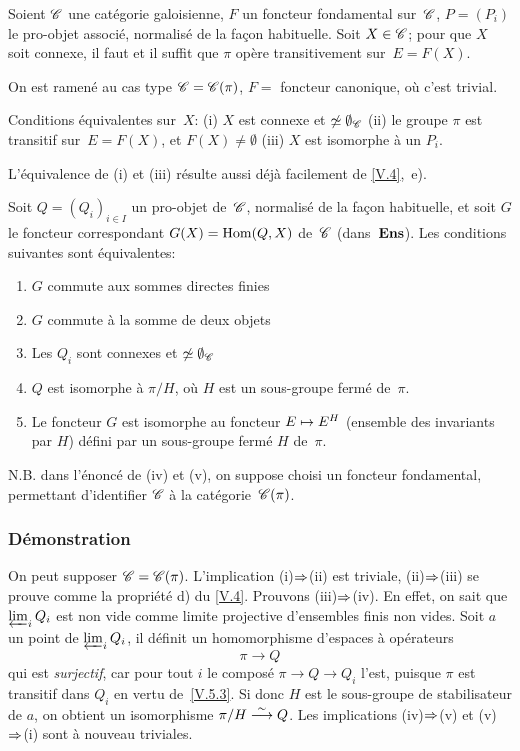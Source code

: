\begin{proposition}
\label{V.5.3}
Soient $\cal{C}$ une cat\'egorie galoisienne, $F$ un foncteur
fondamental
sur~$\cal{C}$,
$P=(P_i)$ le pro-objet associ\'e, normalis\'e de la fa\c con
habituelle. Soit
$X\in\cal{C}$;
pour que $X$ soit connexe, il faut et il suffit que $\pi$ op\`ere
transitivement sur~$E=F(X)$.
\end{proposition}

On est ramen\'e au cas type $\cal{C}=\cal{C}(\pi)$, $F=$ foncteur
canonique, o\`u c'est trivial.

\begin{corollaire}
\label{V.5.4}
Conditions \'equivalentes sur~$X$: \textup{(i)} $X$ est connexe et
$\not\simeq\emptyset_{\cal{C}}$ \textup{(ii)} le groupe $\pi$ est
transitif sur~$E=F(X)$, et $F(X)\ne\emptyset$ \textup{(iii)} $X$ est
isomorphe \`a un $P_i$.
\end{corollaire}

L'\'equivalence
de (i) et (iii) r\'esulte aussi d\'ej\`a facilement de
\No \ref{V.4},~e).

\begin{proposition}
\label{V.5.5}
Soit $Q=(Q_i)_{i\in I}$ un pro-objet
de~$\cal{C}$,
normalis\'e de la fa\c con habituelle, et soit $G$ le foncteur
correspondant $G(X)=\operatorname{Hom}(Q, X)$ de~$\cal{C}$
(dans~$\mathbf{Ens}$).
Les conditions suivantes sont \'equivalentes:
\begin{enumerate}
\item[(i)] $G$ commute aux sommes directes finies
\item[(ii)] $G$ commute \`a la somme de deux objets
\item[(iii)] Les $Q_i$ sont connexes et
$\not\simeq\emptyset_\cal{C}$
\item[(iv)] $Q$ est isomorphe \`a $\pi/H$, o\`u $H$ est un
sous-groupe ferm\'e de~$\pi$.
\item[(v)] Le foncteur $G$ est isomorphe au foncteur $E\mto
E^H$ (ensemble des invariants par $H$) d\'efini par un sous-groupe
ferm\'e $H$ de~$\pi$.
\end{enumerate}
\end{proposition}

N.B. dans l'\'enonc\'e de (iv) et (v), on suppose choisi un
foncteur fondamental, permettant d'identifier $\cal{C}$ \`a la
cat\'egorie~$\cal{C}(\pi)$.

\subsubsection*{D\'emonstration} On peut supposer
$\cal{C}=\cal{C}(\pi)$. L'implication (i)$\To$(ii) est
triviale, (ii)$\To$(iii) se prouve comme la
propri\'et\'e d) du \No \ref{V.4}. Prouvons (iii)$\To$(iv). En
effet, on sait que $\varprojlim_i Q_i$ est non vide comme limite
projective d'ensembles finis non vides. Soit $a$ un point de
$\varprojlim_i Q_i$, il d\'efinit un homomorphisme d'espaces \`a
op\'erateurs
$$
\pi\to Q
$$
qui est \emph{surjectif}, car pour tout $i$ le compos\'e $\pi\to
Q\to Q_i$ l'est, puisque $\pi$ est transitif dans $Q_i$ en vertu
de~\ref{V.5.3}. Si donc $H$ est le sous-groupe de stabilisateur de
$a$, on obtient un isomorphisme $\pi/H\overset{\sim}{\longrightarrow} Q$. Les implications
(iv)$\To$(v) et (v)$\To$(i) sont \`a nouveau
triviales.

